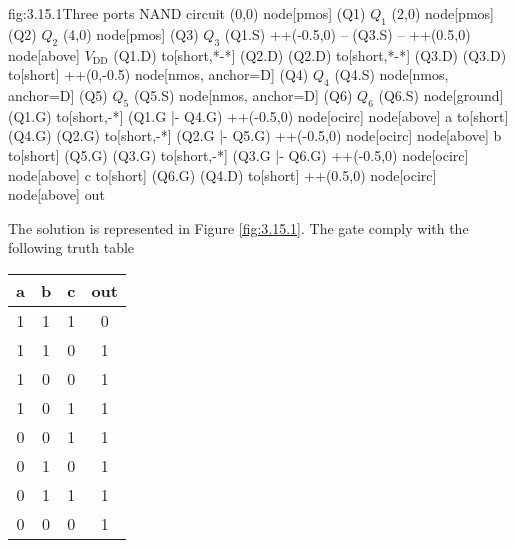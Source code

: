 \begin{circuit}{fig:3.15.1}{Three ports NAND circuit}
    (0,0) node[pmos] (Q1) {$Q_1$}
    (2,0) node[pmos] (Q2) {$Q_2$}
    (4,0) node[pmos] (Q3) {$Q_3$}
    (Q1.S) ++(-0.5,0) -- (Q3.S) -- ++(0.5,0)
    node[above] {$V_\text{DD}$}
    (Q1.D) to[short,*-*] (Q2.D)
    (Q2.D) to[short,*-*] (Q3.D)
    (Q3.D) to[short] ++(0,-0.5)
    node[nmos, anchor=D] (Q4) {$Q_4$}
    (Q4.S) node[nmos, anchor=D] (Q5) {$Q_5$}
    (Q5.S) node[nmos, anchor=D] (Q6) {$Q_6$}
    (Q6.S) node[ground] {}
    (Q1.G) to[short,-*] (Q1.G |- Q4.G)
    ++(-0.5,0)
    node[ocirc] {}
    node[above] {a}
    to[short] (Q4.G)
    (Q2.G) to[short,-*] (Q2.G |- Q5.G)
    ++(-0.5,0)
    node[ocirc] {}
    node[above] {b}
    to[short] (Q5.G)
    (Q3.G) to[short,-*] (Q3.G |- Q6.G)
    ++(-0.5,0)
    node[ocirc] {}
    node[above] {c}
    to[short] (Q6.G)
    (Q4.D) to[short] ++(0.5,0)
    node[ocirc] {}
    node[above] {out}
\end{circuit}
The solution is represented in Figure \ref{fig:3.15.1}. The gate comply with the following truth table
\begin{center}
\begin{tabular}{c c c | c}
    a & b & c & out \\
    \hline
    1 & 1 & 1 & 0 \\
    1 & 1 & 0 & 1 \\
    1 & 0 & 0 & 1 \\
    1 & 0 & 1 & 1 \\
    0 & 0 & 1 & 1 \\
    0 & 1 & 0 & 1 \\
    0 & 1 & 1 & 1 \\
    0 & 0 & 0 & 1 \\
\end{tabular}
\end{center}

